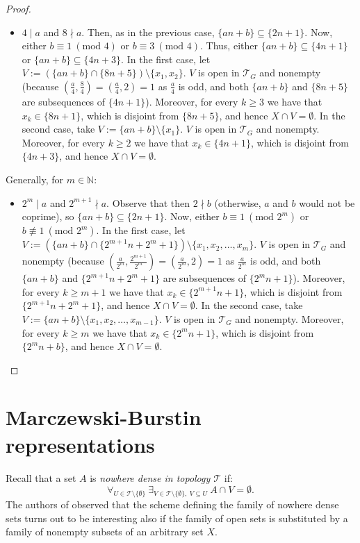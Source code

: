 \documentclass{amsart}
\theoremstyle{definition}
\theoremstyle{definition}
\newcommand{\N}{{\mathbb N}}
\newcommand{\T}{\mathcal{T}}
\newcommand{\modulo}{\textrm{mod }}
\begin{document}
\begin{proof}
\begin{itemize}
 \item $4\mid a$ and $8\nmid a$. Then, as in the previous case, $\{an+b\}\subseteq \{2n+1\}$. Now, either $b\equiv 1\ (\modulo 4)$ or $b\equiv 3\ (\modulo 4)$. Thus, either $\{an+b\}\subseteq \{4n+1\}$ or $\{an+b\}\subseteq \{4n+3\}$. In the first case, let $V := (\{an+b\} \cap \{8n+5\})\setminus\{x_1, x_2\}$. $V$ is open in $\T_G$ and nonempty (because $\left(\frac{a}{4},\frac{8}{4}\right)=\left(\frac{a}{4},2\right)=1$ as $\frac{a}{4}$ is odd, and both $\{an+b\}$ and $\{8n+5\}$ are subsequences of $\{4n+1\}$). Moreover, for every $k\geq 3$ we have that $x_k\in \{8n+1\}$, which is disjoint from $\{8n+5\}$, and hence $X\cap V = \emptyset$. In the second case, take $V := \{an+b\} \setminus\{x_1\}$. $V$ is open in $\T_G$ and nonempty. Moreover, for every $k\geq 2$ we have that $x_k\in \{4n+1\}$, which is disjoint from $\{4n+3\}$, and hence $X\cap V = \emptyset$.
\end{itemize}
Generally, for $m\in\N$:
\begin{itemize}
 \item $2^m\mid a$ and $2^{m+1}\nmid a$. Observe that then $2 \nmid b$ (otherwise, $a$ and $b$ would not be coprime), so $\{an+b\}\subseteq \{2n+1\}$. Now, either $b\equiv 1\ (\modulo 2^m)$ or $b \not\equiv 1\ (\modulo 2^m)$. In the first case, let $V := (\{an+b\} \cap \{2^{m+1}n+2^m+1\})\setminus\{x_1, x_2,\ldots, x_m\}$. $V$ is open in $\T_G$ and nonempty (because $\left(\frac{a}{2^m},\frac{2^{m+1}}{2^m}\right)=\left(\frac{a}{2^m},2\right)=1$ as $\frac{a}{2^m}$ is odd, and both $\{an+b\}$ and $\{2^{m+1}n+2^m+1\}$ are subsequences of $\{2^m n+1\}$). Moreover, for every $k\geq m+1$ we have that $x_k\in \{2^{m+1}n+1\}$, which is disjoint from $\{2^{m+1}n+2^m+1\}$, and hence $X\cap V = \emptyset$. In the second case, take $V := \{an+b\} \setminus\{x_1, x_2,\ldots, x_{m-1}\}$. $V$ is open in $\T_G$ and nonempty. Moreover, for every $k\geq m$ we have that $x_k\in \{2^m n+1\}$, which is disjoint from $\{2^m n+b\}$, and hence $X\cap V = \emptyset$.
\end{itemize}
\end{proof}


\section{Marczewski-Burstin representations}

Recall that a set $A$ is \emph{nowhere dense in topology $\T$} if:
$$\forall_{U\in\T\setminus\{\emptyset\}}\ \exists_{V\in\T\setminus\{\emptyset\},\ V\subseteq U}\ A\cap V = \emptyset.$$
The authors of \cite{MB} observed that the scheme defining the family of nowhere dense sets turns out to be interesting also if the family of open sets is substituted by a family of nonempty subsets of an arbitrary set $X$.
\end{document}
